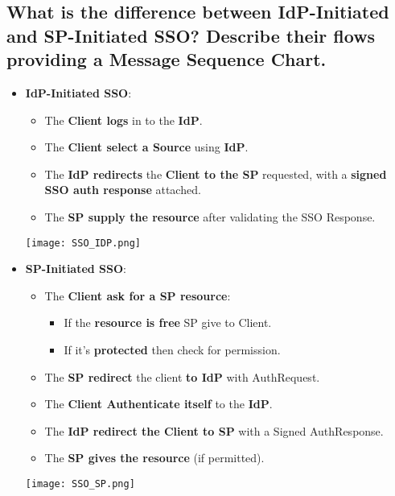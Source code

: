 \documentclass[9pt, letterpaper]{article}
\begin{document}
\subsection{What is the difference between IdP-Initiated and SP-Initiated SSO? Describe their flows providing a Message Sequence Chart.}
\begin{itemize}
	\item \textbf{IdP-Initiated SSO}:
	      \begin{itemize}
		      \item The \textbf{Client logs} in to the \textbf{IdP}.
		      \item The \textbf{Client select a Source} using \textbf{IdP}.
		      \item The \textbf{IdP redirects} the \textbf{Client to the SP} requested, with a \textbf{signed SSO auth response} attached.
		      \item The \textbf{SP supply the resource} after validating the SSO Response.
	      \end{itemize}
	      \begin{center}
		      \texttt{[image: SSO\_IDP.png]}
	      \end{center}
	      \newpage
	\item \textbf{SP-Initiated SSO}:
	      \begin{itemize}
		      \item The \textbf{Client ask for a SP resource}:
		            \begin{itemize}
			            \item If the \textbf{resource is free} SP give to Client.
			            \item If it's \textbf{protected} then check for permission.
		            \end{itemize}
		      \item The \textbf{SP redirect} the client \textbf{to IdP} with AuthRequest.
		      \item The \textbf{Client Authenticate itself} to the \textbf{IdP}.
		      \item The \textbf{IdP redirect the Client to SP} with a Signed AuthResponse.
		      \item The \textbf{SP gives the resource} (if permitted).
	      \end{itemize}
	      \begin{center}
		      \texttt{[image: SSO\_SP.png]}
	      \end{center}
\end{itemize}
\end{document}
